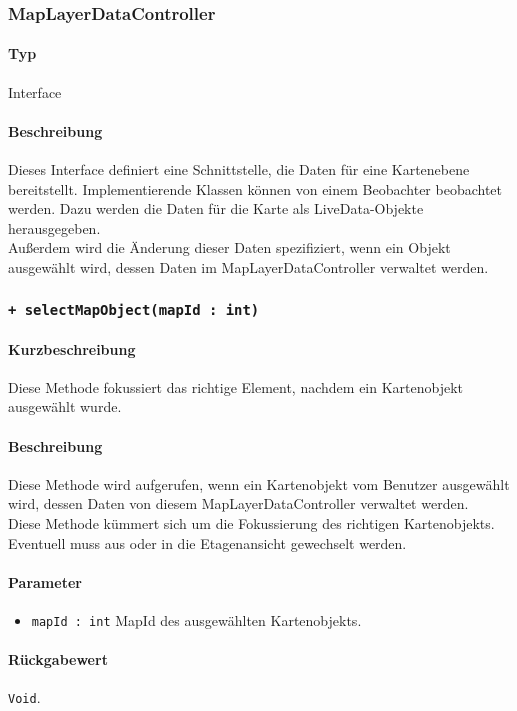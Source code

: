 \subsubsection{MapLayerDataController}
\paragraph*{Typ} 
Interface
\paragraph*{Beschreibung}
Dieses Interface definiert eine Schnittstelle, die Daten für eine Kartenebene bereitstellt.
Implementierende Klassen können von einem Beobachter beobachtet werden. Dazu werden die 
Daten für die Karte als LiveData-Objekte herausgegeben.\\
Außerdem wird die Änderung dieser Daten spezifiziert, wenn ein Objekt ausgewählt wird, dessen
Daten im MapLayerDataController verwaltet werden.

\subsubsection*{\texttt{+ selectMapObject(mapId : int)}}%
\paragraph*{Kurzbeschreibung}
Diese Methode fokussiert das richtige Element, nachdem ein Kartenobjekt ausgewählt wurde.
\paragraph*{Beschreibung}
Diese Methode wird aufgerufen, wenn ein Kartenobjekt vom Benutzer ausgewählt wird, dessen 
Daten von diesem MapLayerDataController verwaltet werden.\\
Diese Methode kümmert sich um die Fokussierung des richtigen Kartenobjekts. Eventuell muss 
aus oder in die Etagenansicht gewechselt werden.
\paragraph*{Parameter}
\begin{itemize}
    \item \texttt{mapId : int} MapId des ausgewählten Kartenobjekts.
\end{itemize}
\paragraph*{Rückgabewert}
\texttt{Void}.

